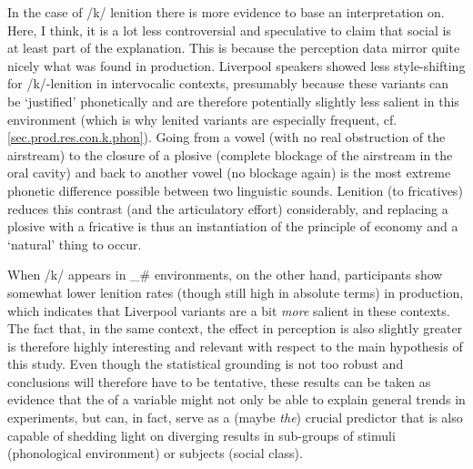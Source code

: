 In the case of /k/ lenition there is more evidence to base an interpretation on.
Here, I think, it is a lot less controversial and speculative to claim that social  is at least part of the explanation.
This is because the perception data mirror quite nicely what was found in production.
Liverpool speakers showed less style-shifting for /k/-lenition in intervocalic contexts, presumably because these variants can be `justified' phonetically and are therefore potentially slightly less salient in this environment (which is why lenited variants are especially frequent, cf. \ref{sec.prod.res.con.k.phon}).
Going from a vowel (with no real obstruction of the airstream) to the closure of a plosive (complete blockage of the airstream in the oral cavity) and back to another vowel (no blockage again) is the most extreme phonetic difference possible between two linguistic sounds.
Lenition (to fricatives) reduces this contrast (and the articulatory effort) considerably, and replacing a plosive with a fricative is thus an instantiation of the principle of economy and a `natural' thing to occur.

When /k/ appears in \_\# environments, on the other hand, participants show somewhat lower lenition rates (though still high in absolute terms) in production, which indicates that Liverpool variants are a bit \emph{more} salient in these contexts.
The fact that, in the same context, the  effect in perception is also slightly greater is therefore highly interesting and relevant with respect to the main hypothesis of this study.
Even though the statistical grounding is not too robust and conclusions will therefore have to be tentative, these results can be taken as evidence that the  of a variable might not only be able to explain general trends in   experiments, but can, in fact, serve as a (maybe \emph{the}) crucial predictor that is also capable of shedding light on diverging results in sub-groups of stimuli (phonological environment) or subjects (social class).

